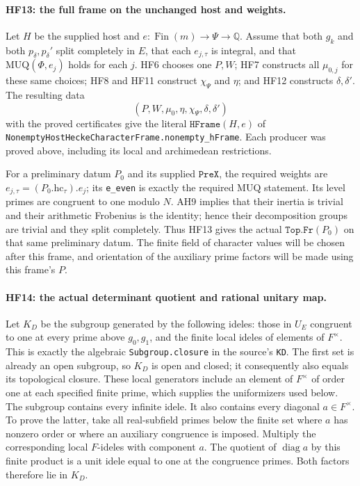 \paragraph{HF13: the full frame on the unchanged host and weights.}
Let $H$ be the supplied host and
$e:\operatorname{Fin}(m)\to\Psi\to\mathbb Q$.
Assume that both $g_k$ and both $p_\delta,p_\delta'$
split completely in $E$, that each $e_{j,\tau}$ is
integral, and that $\mathrm{MUQ}(\Phi,e_j)$ holds for
each $j$. HF6 chooses one $P,W$; HF7 constructs all
$\mu_{0,j}$ for these same choices; HF8 and HF11
construct $\chi_\Psi$ and $\eta$; and HF12 constructs
$\delta,\delta'$. The resulting data
\[
          (P,W,\mu_0,\eta,\chi_\Psi,\delta,\delta')
 \tag{HF.29}
\]
with the proved certificates give the literal
$\texttt{HFrame}(H,e)$ of
\texttt{NonemptyHostHeckeCharacterFrame.nonempty\_hFrame}.
Each producer was proved above, including its local
and archimedean restrictions.

For a preliminary datum $P_0$ and its supplied
$\texttt{PreX}$, the required weights are
$e_{j,\tau}=(P_0.\mathrm{hc}_\tau).e_j$;
its \texttt{e\_even} is exactly the required
$\mathrm{MUQ}$ statement. Its level primes are
congruent to one modulo $N$. AH9 implies that their
inertia is trivial and their arithmetic Frobenius is
the identity; hence their decomposition groups are
trivial and they split completely. Thus HF13 gives
the actual $\texttt{Top.Fr}(P_0)$ on that same
preliminary datum. The finite field of character
values will be chosen after this frame, and orientation
of the auxiliary prime factors will be made using
this frame's $P$.

\paragraph{HF14: the actual determinant quotient and rational unitary map.}
Let $K_D$ be the subgroup generated by the following
ideles: those in $U_E$ congruent to one at every prime
above $g_0,g_1$, and the finite local ideles of elements
of $F^\times$. This is exactly the algebraic
\texttt{Subgroup.closure} in the source's \texttt{KD}.
The first set is already an open subgroup, so $K_D$
is open and closed; it consequently also equals its
topological closure. These local generators include
an element of $F^\times$ of order one at each specified
finite prime, which supplies the uniformizers used
below. The subgroup contains every infinite idele.
It also contains every diagonal
$a\in F^\times$. To prove the latter, take all real-subfield
primes below the finite set where $a$ has nonzero order or
where an auxiliary congruence is imposed. Multiply the
corresponding local $F$-ideles with component $a$.
The quotient of $\operatorname{diag}a$ by this finite product
is a unit idele equal to one at the congruence primes.
Both factors therefore lie in $K_D$.

